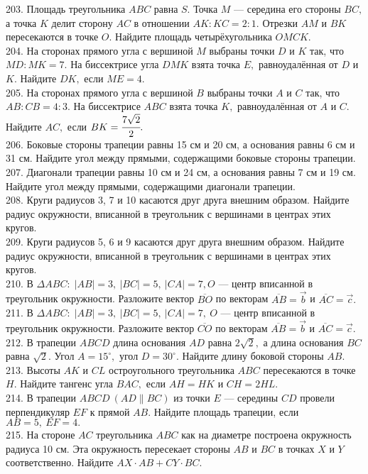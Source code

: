 203. Площадь треугольника $ABC$ равна $S.$ Точка $M$ --- середина его стороны $BC,$ а точка $K$ делит сторону $AC$ в отношении $AK:KC=2:1.$ Отрезки $AM$ и $BK$ пересекаются в точке $O.$ Найдите площадь четырёхугольника $OMCK.$\\
204. На сторонах прямого угла с вершиной $M$ выбраны точки $D$ и $K$ так, что $MD : MK = 7.$ На
биссектрисе угла $DMK$ взята точка $E,$ равноудалённая от $D$ и $K.$ Найдите $DK,$ если $ME = 4.$\\
205. На сторонах прямого угла с вершиной $B$ выбраны точки $A$ и $C$ так, что $AB : CB = 4 : 3.$ На
биссектрисе $ABC$ взята точка $K,$ равноудалённая от $A$ и $C.$ Найдите $AC,$ если $BK =\cfrac{7\sqrt{2}}{2}.$\\
206. Боковые стороны трапеции равны 15 см и 20 см, а основания равны 6 см и 31 см. Найдите угол между прямыми, содержащими боковые стороны трапеции.\\
207. Диагонали трапеции равны 10 см и 24 см, а основания равны 7 см и 19 см. Найдите угол между прямыми, содержащими диагонали трапеции.\\
208. Круги радиусов 3, 7 и 10 касаются друг друга внешним образом. Найдите радиус окружности, вписанной в треугольник с вершинами в центрах этих кругов.\\
209. Круги радиусов 5, 6 и 9 касаются друг друга внешним образом. Найдите радиус окружности, вписанной в треугольник с вершинами в центрах этих кругов.\\
210. В $\Delta ABC:\; |AB| = 3,\ |BC| = 5,\ |CA| = 7, O$ --- центр вписанной в треугольник окружности.
Разложите вектор  $\overline{BO}$ по векторам  $\overline{AB}=\vec{b}$ и  $\overline{AC}=\vec{c}.$\\
211. В $\Delta ABC:\; |AB| = 3,\ |BC| = 5,\ |CA| = 7,\ O$ --- центр вписанной в треугольник окружности. Разложите вектор $\overline{CO}$ по векторам
$\overline{AB}=\vec{b}$ и  $\overline{AC}=\vec{c}.$\\
212. В трапеции  $ABCD$ длина основания  $AD$ равна  $2\sqrt{2},$ а длина основания  $BC$ равна  $\sqrt{2}.$ Угол $A=15^\circ,$
угол $D=30^\circ.$ Найдите длину боковой стороны  $AB.$\\
213. Высоты  $AK$ и  $CL$ остроугольного треугольника  $ABC$ пересекаются в точке  $H.$ Найдите тангенс угла
$BAC,$ если  $AH=HK$ и  $CH=2HL.$\\
214. В трапеции  $ABCD\  (AD\parallel BC)$ из точки  $E$ --- середины  $CD$ провели перпендикуляр  $EF$ к прямой  $AB.$
Найдите площадь трапеции, если  $AB=5,\ EF=4.$\\
215. На стороне  $AC$ треугольника  $ABC$ как на диаметре построена окружность радиуса 10 см. Эта
окружность пересекает стороны  $AB$ и  $BC$ в точках  $X$ и  $Y$ соответственно. Найдите  $AX\cdot AB + CY\cdot BC.$
\newpage
